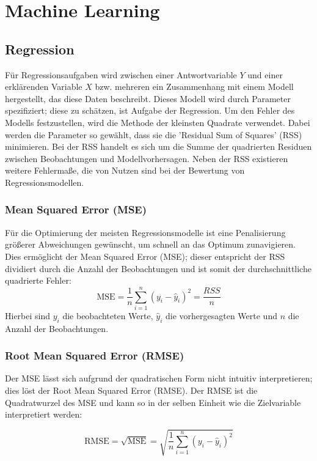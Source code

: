 
\section{Machine Learning}
\label{sec:maschinelearning}
\subsection{Regression}
Für Regressionsaufgaben wird zwischen einer Antwortvariable \(Y\) und einer erklärenden Variable \(X\) bzw. mehreren ein Zusammenhang mit einem Modell hergestellt, das diese Daten beschreibt. Dieses Modell wird durch Parameter spezifiziert; diese zu schätzen, ist Aufgabe der Regression. Um den Fehler des Modells festzustellen, wird die Methode der kleinsten Quadrate verwendet. Dabei werden die Parameter so gewählt, dass sie die 'Residual Sum of Squares' (RSS) minimieren. Bei der RSS handelt es sich um die Summe der quadrierten Residuen zwischen Beobachtungen und Modellvorhersagen. Neben der RSS existieren weitere Fehlermaße, die von Nutzen sind bei der Bewertung von Regressionsmodellen.

\subsubsection{Mean Squared Error (MSE)}
Für die Optimierung der meisten Regressionsmodelle ist eine Penalisierung größerer Abweichungen gewünscht, um schnell an das Optimum zunavigieren. Dies ermöglicht der Mean Squared Error (MSE); dieser entspricht der RSS dividiert durch die Anzahl der Beobachtungen und ist somit der durchschnittliche quadrierte Fehler:
\begin{equation}
  \text{MSE} = \frac{1}{n} \sum_{i=1}^{n} (y_i - \hat{y}_i)^2 = \frac{RSS}{n}
  \label{eq:mse}
\end{equation}
Hierbei sind \(y_i\) die beobachteten Werte, \(\hat{y}_i\) die vorhergesagten Werte und \(n\) die Anzahl der Beobachtungen.

\subsubsection{Root Mean Squared Error (RMSE)}
Der MSE lässt sich aufgrund der quadratischen Form nicht intuitiv interpretieren; dies löst der Root Mean Squared Error (RMSE). Der RMSE ist die Quadratwurzel des MSE und kann so in der selben Einheit wie die Zielvariable interpretiert werden:

\begin{equation}
  \text{RMSE} = \sqrt{\text{MSE}} = \sqrt{\frac{1}{n} \sum_{i=1}^{n} (y_i - \hat{y}_i)^2}
  \label{eq:rmse}
\end{equation}

